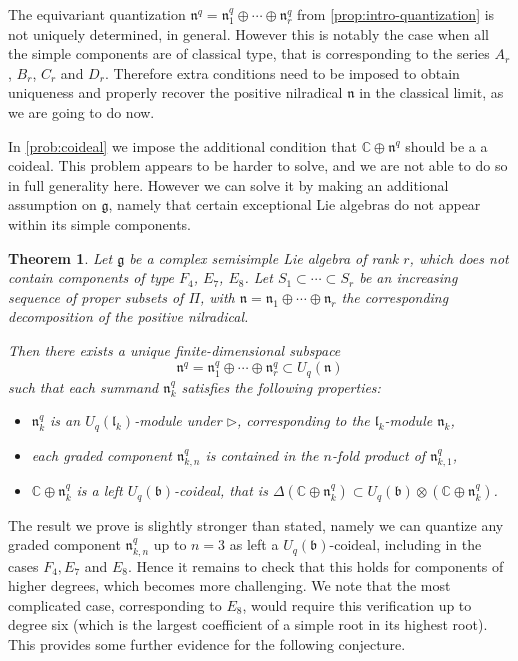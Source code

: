 \documentclass[a4paper, 12pt, reqno, english]{amsart}
\numberwithin{equation}{section}
\numberwithin{figure}{section}
\theoremstyle{plain}
\newtheorem{theorem}{Theorem}[section]
\theoremstyle{plain}
\theoremstyle{plain}
\theoremstyle{plain}
\theoremstyle{plain}
\theoremstyle{definition}
\theoremstyle{definition}
\theoremstyle{definition}
\theoremstyle{remark}
\theoremstyle{definition}
\theoremstyle{definition}
\newcommand{\Uqb}{U_q(\mathfrak{b})}
\newcommand{\Uqn}{U_q(\mathfrak{n})}
\newcommand{\bbC}{\mathbb{C}}
\newcommand{\lieg}{\mathfrak{g}}
\newcommand{\liel}{\mathfrak{l}}
\newcommand{\lien}{\mathfrak{n}}
\newcommand{\simpleroots}{\Pi}
\newcommand{\qnil}{\lien^q}
\begin{document}
The equivariant quantization $\qnil = \qnil_1 \oplus \cdots \oplus \qnil_r$ from \cref{prop:intro-quantization} is not uniquely determined, in general. However this is notably the case when all the simple components are of classical type, that is corresponding to the series $A_r$, $B_r$, $C_r$ and $D_r$.
Therefore extra conditions need to be imposed to obtain uniqueness and properly recover the positive nilradical $\lien$ in the classical limit, as we are going to do now.

In \cref{prob:coideal} we impose the additional condition that $\bbC \oplus \qnil$ should be a a coideal. This problem appears to be harder to solve, and we are not able to do so in full generality here.
However we can solve it by making an additional assumption on $\lieg$, namely that certain exceptional Lie algebras do not appear within its simple components.

\begin{theorem}
\label{thm:intro-coideal}
Let $\lieg$ be a complex semisimple Lie algebra of rank $r$, which does not contain components of type $F_4$, $E_7$, $E_8$.
Let $S_1 \subset \cdots \subset S_r$ be an increasing sequence of proper subsets of $\simpleroots$, with $\lien = \lien_1 \oplus \cdots \oplus \lien_r$ the corresponding decomposition of the positive nilradical.

Then there exists a unique finite-dimensional subspace
\[
\qnil = \qnil_1 \oplus \cdots \oplus \qnil_r \subset \Uqn
\]
such that each summand $\qnil_k$ satisfies the following properties:
\begin{itemize}
\item $\qnil_k$ is an $U_q(\liel_k)$-module under $\triangleright$, corresponding to the $\liel_k$-module $\lien_k$,
\item each graded component $\qnil_{k, n}$ is contained in the $n$-fold product of $\qnil_{k, 1}$,
\item $\bbC \oplus \qnil_k$ is a left $\Uqb$-coideal, that is $\Delta(\bbC \oplus \qnil_k) \subset \Uqb \otimes (\bbC \oplus \qnil_k)$.
\end{itemize}
\end{theorem}

The result we prove is slightly stronger than stated, namely we can quantize any graded component $\qnil_{k, n}$ up to $n = 3$ as left a $\Uqb$-coideal, including in the cases $F_4, E_7$ and $E_8$.
Hence it remains to check that this holds for components of higher degrees, which becomes more challenging.
We note that the most complicated case, corresponding to $E_8$, would require this verification up to degree six (which is the largest coefficient of a simple root in its highest root).
This provides some further evidence for the following conjecture.
\end{document}
